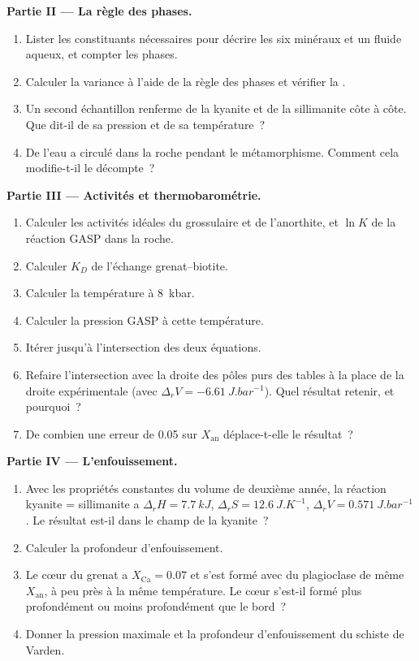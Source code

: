 \begin{problem}
\medskip\noindent\textbf{Partie II --- La règle des phases.}
\begin{enumerate}[resume]
  \item Lister les constituants nécessaires pour décrire les six minéraux et un fluide
        aqueux, et compter les phases.
  \item Calculer la variance à l'aide de la règle des phases et vérifier la
        .
  \item Un second échantillon renferme de la kyanite et de la sillimanite côte à côte. Que
        dit-il de sa pression et de sa température~?
  \item De l'eau a circulé dans la roche pendant le métamorphisme. Comment cela
        modifie-t-il le décompte~?
\end{enumerate}

\medskip\noindent\textbf{Partie III --- Activités et thermobarométrie.}
\begin{enumerate}[resume]
  \item Calculer les activités idéales du grossulaire et de l'anorthite, et $\ln K$
        de la réaction GASP dans la roche.
  \item Calculer $K_D$ de l'échange grenat--biotite.
  \item Calculer la température à \qty{8}{kbar}.
  \item Calculer la pression GASP à cette température.
  \item Itérer jusqu'à l'intersection des deux équations.
  \item Refaire l'intersection avec la droite des pôles purs des tables
        à la place de la droite expérimentale (avec $\Delta_rV = \qty{-6.61}{J.bar^{-1}}$).
        Quel résultat retenir, et pourquoi~?
  \item De combien une erreur de 0.05 sur $X_{\text{an}}$ déplace-t-elle le
        résultat~?
\end{enumerate}

\medskip\noindent\textbf{Partie IV --- L'enfouissement.}
\begin{enumerate}[resume]
  \item Avec les propriétés constantes du volume de deuxième année, la réaction kyanite =
        sillimanite a $\Delta_rH = \qty{7.7}{kJ}$, $\Delta_rS =
        \qty{12.6}{J.K^{-1}}$, $\Delta_rV = \qty{0.571}{J.bar^{-1}}$. Le résultat
        est-il dans le champ de la kyanite~?
  \item Calculer la profondeur d'enfouissement.
  \item Le cœur du grenat a $X_{\text{Ca}} = 0.07$ et s'est formé avec du plagioclase
        de même $X_{\text{an}}$, à peu près à la même température. Le cœur s'est-il
        formé plus profondément ou moins profondément que le bord~?
  \item Donner la pression maximale et la profondeur d'enfouissement du schiste de Varden.
\end{enumerate}
\end{problem}
